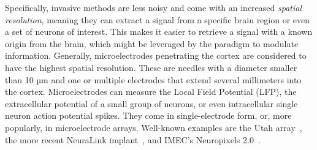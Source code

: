 
Specifically, invasive methods are less noisy and come with an increased \emph{spatial
resolution}, meaning they can extract a signal from a specific brain region or even a
set of neurons of interest.
This makes it easier to retrieve a signal with a known origin from the brain, which
might be leveraged by the paradigm to modulate information.
Generally, microelectrodes penetrating the cortex are considered to have the highest
spatial resolution.
These are needles with a diameter smaller than 10 µm and one or multiple electrodes that
extend several millimeters into the cortex.
Microelectrodes can measure the Local Field Potential (LFP), the extracellular potential
of a small group of neurons, or even intracellular single neuron action potential
spikes.
They come in single-electrode form, or, more popularly, in microelectrode arrays.
Well-known examples are the Utah array~\cite{Maynard1997}, the more recent NeuraLink
implant~\cite{Musk2019}, and IMEC's Neuropixels 2.0~\cite{Steinmetz2021}.


